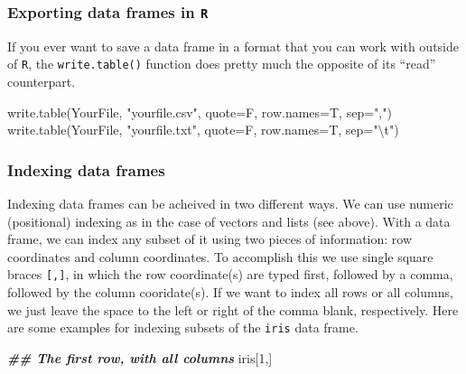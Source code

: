 \documentclass[
]{book}
\newenvironment{Shaded}{\begin{snugshade}}{\end{snugshade}}
\newcommand{\AttributeTok}[1]{\textcolor[rgb]{0.77,0.63,0.00}{#1}}
\newcommand{\DecValTok}[1]{\textcolor[rgb]{0.00,0.00,0.81}{#1}}
\newcommand{\DocumentationTok}[1]{\textcolor[rgb]{0.56,0.35,0.01}{\textbf{\textit{#1}}}}
\newcommand{\FunctionTok}[1]{\textcolor[rgb]{0.00,0.00,0.00}{#1}}
\newcommand{\NormalTok}[1]{#1}
\newcommand{\SpecialCharTok}[1]{\textcolor[rgb]{0.00,0.00,0.00}{#1}}
\newcommand{\StringTok}[1]{\textcolor[rgb]{0.31,0.60,0.02}{#1}}
\begin{document}
\hypertarget{exporting-data-frames-in-r}{%
\subsubsection{\texorpdfstring{Exporting data frames in \texttt{R}}{Exporting data frames in R}}\label{exporting-data-frames-in-r}}

If you ever want to save a data frame in a format that you can work with outside of \texttt{R}, the \texttt{write.table()} function does pretty much the opposite of its ``read'' counterpart.

\begin{Shaded}
\begin{Highlighting}[]
\FunctionTok{write.table}\NormalTok{(YourFile, }\StringTok{"yourfile.csv"}\NormalTok{, }\AttributeTok{quote=}\NormalTok{F, }\AttributeTok{row.names=}\NormalTok{T, }\AttributeTok{sep=}\StringTok{","}\NormalTok{)}
\FunctionTok{write.table}\NormalTok{(YourFile, }\StringTok{"yourfile.txt"}\NormalTok{, }\AttributeTok{quote=}\NormalTok{F, }\AttributeTok{row.names=}\NormalTok{T, }\AttributeTok{sep=}\StringTok{"}\SpecialCharTok{\textbackslash{}t}\StringTok{"}\NormalTok{)}
\end{Highlighting}
\end{Shaded}

\hypertarget{indexing-data-frames}{%
\subsubsection{Indexing data frames}\label{indexing-data-frames}}

Indexing data frames can be acheived in two different ways. We can use numeric (positional) indexing as in the case of vectors and lists (see above). With a data frame, we can index any subset of it using two pieces of information: row coordinates and column coordinates. To accomplish this we use single square braces \texttt{{[},{]}}, in which the row coordinate(s) are typed first, followed by a comma, followed by the column cooridate(s). If we want to index all rows or all columns, we just leave the space to the left or right of the comma blank, respectively. Here are some examples for indexing subsets of the \texttt{iris} data frame.

\begin{Shaded}
\begin{Highlighting}[]
\DocumentationTok{\#\# The first row, with all columns}
\NormalTok{iris[}\DecValTok{1}\NormalTok{,]}
\end{Highlighting}
\end{Shaded}
\end{document}
